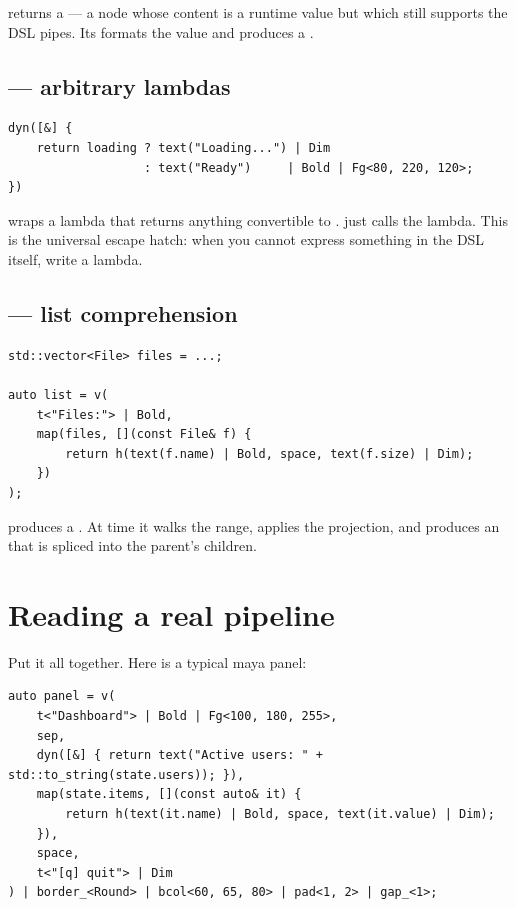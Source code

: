  returns a  --- a node whose
content is a runtime value but which still supports the DSL pipes.
Its  formats the value and produces a
.

\subsection{ --- arbitrary lambdas}

\begin{lstlisting}
dyn([&] {
    return loading ? text("Loading...") | Dim
                   : text("Ready")     | Bold | Fg<80, 220, 120>;
})
\end{lstlisting}

 wraps a lambda that returns anything convertible to
.  just calls the lambda. This is the
universal escape hatch: when you cannot express something in the DSL
itself, write a lambda.

\subsection{ --- list comprehension}

\begin{lstlisting}
std::vector<File> files = ...;

auto list = v(
    t<"Files:"> | Bold,
    map(files, [](const File& f) {
        return h(text(f.name) | Bold, space, text(f.size) | Dim);
    })
);
\end{lstlisting}

 produces a . At  time it
walks the range, applies the projection, and produces an
 that is spliced into the parent's children.

\section{Reading a real pipeline}

Put it all together. Here is a typical maya panel:

\begin{lstlisting}
auto panel = v(
    t<"Dashboard"> | Bold | Fg<100, 180, 255>,
    sep,
    dyn([&] { return text("Active users: " + std::to_string(state.users)); }),
    map(state.items, [](const auto& it) {
        return h(text(it.name) | Bold, space, text(it.value) | Dim);
    }),
    space,
    t<"[q] quit"> | Dim
) | border_<Round> | bcol<60, 65, 80> | pad<1, 2> | gap_<1>;
\end{lstlisting}

